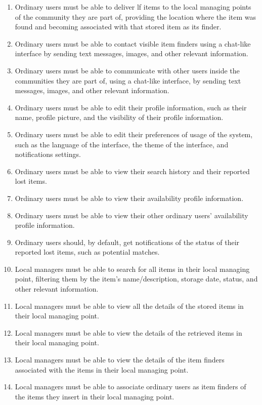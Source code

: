 \begin{enumerate}
    \item Ordinary users must be able to deliver \ac{lf} items to the local managing points of the community they are part of, providing the location where the item was found and becoming associated with that stored item as its finder.
    \item Ordinary users must be able to contact visible item finders using a chat-like interface by sending text messages, images, and other relevant information.
    \item Ordinary users must be able to communicate with other users inside the communities they are part of, using a chat-like interface, by sending text messages, images, and other relevant information.
    \item Ordinary users must be able to edit their profile information, such as their name, profile picture, and the visibility of their profile information.
    \item Ordinary users must be able to edit their preferences of usage of the system, such as the language of the interface, the theme of the interface, and notifications settings.
    \item Ordinary users must be able to view their search history and their reported lost items.
    \item Ordinary users must be able to view their availability profile information.
    \item Ordinary users must be able to view their other ordinary users' availability profile information.
    \item Ordinary users should, by default, get notifications of the status of their reported lost items, such as potential matches.
    \item Local managers must be able to search for all items in their local managing point, filtering them by the item's name/description, storage date, status, and other relevant information.
    \item Local managers must be able to view all the details of the stored items in their local managing point.
    \item Local managers must be able to view the details of the retrieved items in their local managing point.
    \item Local managers must be able to view the details of the item finders associated with the items in their local managing point.
    \item Local managers must be able to associate ordinary users as item finders of the items they insert in their local managing point.

\end{enumerate}
